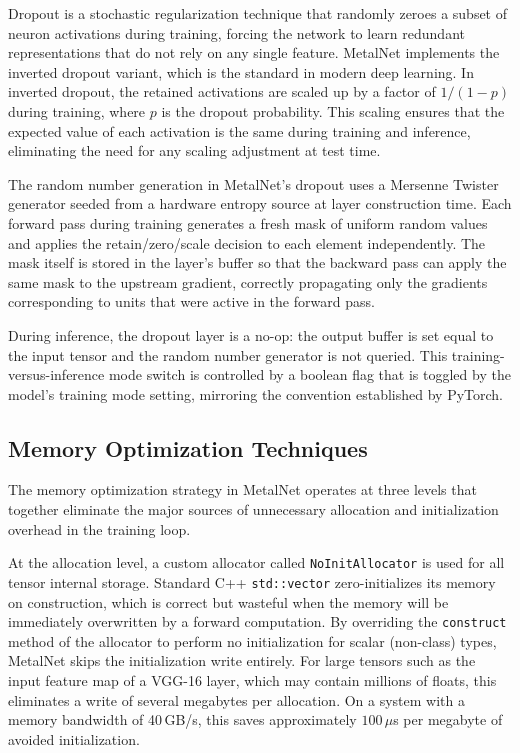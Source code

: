 \documentclass[12pt,oneside,a4paper]{report}
\begin{document}
Dropout is a stochastic regularization technique that randomly zeroes a subset of neuron activations during training, forcing the network to learn redundant representations that do not rely on any single feature. MetalNet implements the inverted dropout variant, which is the standard in modern deep learning. In inverted dropout, the retained activations are scaled up by a factor of $1 / (1 - p)$ during training, where $p$ is the dropout probability. This scaling ensures that the expected value of each activation is the same during training and inference, eliminating the need for any scaling adjustment at test time.

The random number generation in MetalNet's dropout uses a Mersenne Twister generator seeded from a hardware entropy source at layer construction time. Each forward pass during training generates a fresh mask of uniform random values and applies the retain/zero/scale decision to each element independently. The mask itself is stored in the layer's buffer so that the backward pass can apply the same mask to the upstream gradient, correctly propagating only the gradients corresponding to units that were active in the forward pass.

During inference, the dropout layer is a no-op: the output buffer is set equal to the input tensor and the random number generator is not queried. This training-versus-inference mode switch is controlled by a boolean flag that is toggled by the model's training mode setting, mirroring the convention established by PyTorch.

\subsection{Memory Optimization Techniques}

The memory optimization strategy in MetalNet operates at three levels that together eliminate the major sources of unnecessary allocation and initialization overhead in the training loop.

At the allocation level, a custom allocator called \texttt{NoInitAllocator} is used for all tensor internal storage. Standard C++ \texttt{std::vector} zero-initializes its memory on construction, which is correct but wasteful when the memory will be immediately overwritten by a forward computation. By overriding the \texttt{construct} method of the allocator to perform no initialization for scalar (non-class) types, MetalNet skips the initialization write entirely. For large tensors such as the input feature map of a VGG-16 layer, which may contain millions of floats, this eliminates a write of several megabytes per allocation. On a system with a memory bandwidth of 40\,GB/s, this saves approximately $100\,\mu$s per megabyte of avoided initialization.
\end{document}
